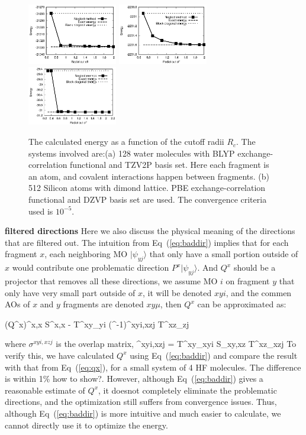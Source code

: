 \documentclass[aps,prl,twocolumn,reprint,amsmath,amssymb]{revtex4-1}
\begin{document}
\begin{figure}
\includegraphics[width=0.35\textwidth]{CdSe}
\includegraphics[width=0.35\textwidth]{H2O}
\includegraphics[width=0.35\textwidth]{Si}
\caption{The calculated energy as a function of the cutoff radii $R_c$. The systems involved are:(a) 128 water molecules with BLYP exchange-correlation functional and TZV2P basis set. Here each fragment is an atom, and covalent interactions happen between fragments. (b) 512 Silicon atoms with dimond lattice. PBE exchange-correlation functional and DZVP basis set are used. The convergence criteria used is $10^{-5}$.}
\label{fig:accuracy}
\end{figure}

\textbf{filtered directions}
Here we also discuss the physical meaning of the directions that are filtered out. The intuition from Eq~(\ref{eq:baddir}) implies that for each fragment $x$, each neighboring MO $|\psi_{yj}\rangle$ that only have a small portion outside of $x$ would contribute one problematic direction $P^x | \psi_{yj}\rangle$. And $Q^x$ should be a projector that removes all these directions, we assume MO $i$ on fragment $y$ that only have very small part outside of $x$, it will be denoted $xyi$, and the commen AOs of $x$ and $y$ fragments are denoted $xy\mu$, then $Q^x$ can be approximated as:

\bea
(Q^x)^{x\mu,x\nu} \approx S^{x\mu,x\nu} - T^{xy\mu}_{yi} (\sigma^{-1})^{xyi,xzj} T^{xz\mu}_{zj}
\label{eq:approxq}
\eea

where $\sigma^{xyi,xzj}$ is the overlap matrix,
\bea
\sigma^{xyi,xzj} = T^{xy\mu}_{xyi} S_{xy\mu,xz\nu} T^{xz\nu}_{xzj}
\eea
To verify this, we have calculated $Q^x$ using Eq~(\ref{eq:baddir}) and compare the result with that from Eq~(\ref{eq:qx}), for a small system of 4 HF molecules. The difference is within 1\% \new how to show?\old. However, although Eq~(\ref{eq:baddir}) gives a reasonable estimate of $Q^x$, it doesnot completely eliminate the problematic directions, and the optimization still suffers from convergence issues. Thus, although Eq~(\ref{eq:baddir}) is more intuitive and much easier to calculate, we cannot directly use it to optimize the energy.
\end{document}
